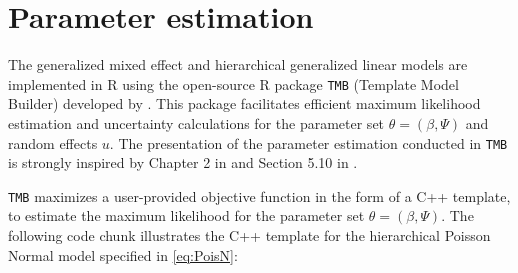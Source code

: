 \documentclass[preprint, 3p, authoryear]{elsarticle} %
\begin{document}
\hypertarget{parameter-estimation}{%
\section{Parameter estimation}\label{parameter-estimation}}

The generalized mixed effect and hierarchical generalized linear models are implemented in R using the open-source R package \texttt{TMB} (Template Model Builder) developed by \citet{Kristensen_2016}. This package facilitates efficient maximum likelihood estimation and uncertainty calculations for the parameter set \(\theta=(\beta, \Psi)\) and random effects \(u\). The presentation of the parameter estimation conducted in \texttt{TMB} is strongly inspired by Chapter 2 in \citet{Kristensen_2016} and Section 5.10 in \citet{Madsen_2010}.

\texttt{TMB} maximizes a user-provided objective function in the form of a C++ template, to estimate the maximum likelihood for the parameter set \(\theta=(\beta, \Psi)\). The following code chunk illustrates the C++ template for the hierarchical Poisson Normal model specified in \ref{eq:PoisN}:
\end{document}
